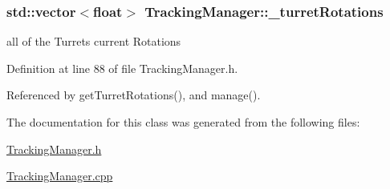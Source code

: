 \hypertarget{classTrackingManager_adce9702d80c3554e7a359a145a6d2632}{
\subsubsection[{\-\_\-turret\-Rotations}]{\setlength{\rightskip}{0pt plus 5cm}std\-::vector$<$float$>$ Tracking\-Manager\-::\-\_\-turret\-Rotations\hspace{0.3cm}{\ttfamily [private]}}}\label{classTrackingManager_adce9702d80c3554e7a359a145a6d2632}


all of the Turrets current Rotations 



Definition at line 88 of file Tracking\-Manager.\-h.



Referenced by get\-Turret\-Rotations(), and manage().



The documentation for this class was generated from the following files\-:\begin{DoxyCompactItemize}
\item 
\hyperlink{TrackingManager_8h}{Tracking\-Manager.\-h}\item 
\hyperlink{TrackingManager_8cpp}{Tracking\-Manager.\-cpp}\end{DoxyCompactItemize}
